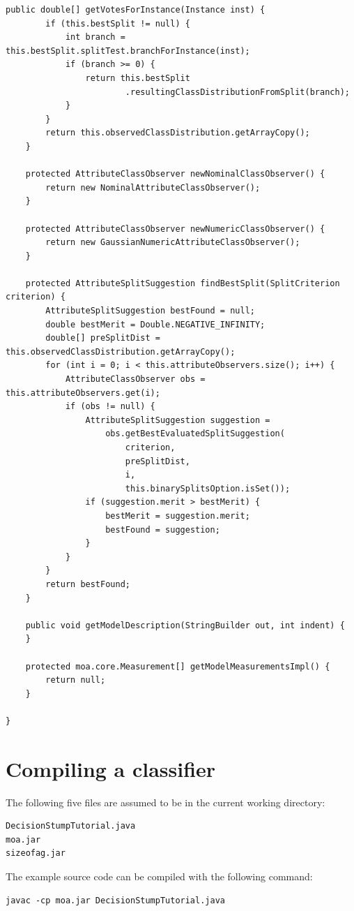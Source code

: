\documentclass[a4paper,12pt,twoside]{book}
\begin{document}
\begin{lstlisting}[caption={Full listing},label=lst:fullclassifier]
	public double[] getVotesForInstance(Instance inst) {
		if (this.bestSplit != null) {
			int branch = this.bestSplit.splitTest.branchForInstance(inst);
			if (branch >= 0) {
				return this.bestSplit
						.resultingClassDistributionFromSplit(branch);
			}
		}
		return this.observedClassDistribution.getArrayCopy();
	}

	protected AttributeClassObserver newNominalClassObserver() {
		return new NominalAttributeClassObserver();
	}

	protected AttributeClassObserver newNumericClassObserver() {
		return new GaussianNumericAttributeClassObserver();
	}

	protected AttributeSplitSuggestion findBestSplit(SplitCriterion criterion) {
		AttributeSplitSuggestion bestFound = null;
		double bestMerit = Double.NEGATIVE_INFINITY;
		double[] preSplitDist = this.observedClassDistribution.getArrayCopy();
		for (int i = 0; i < this.attributeObservers.size(); i++) {
			AttributeClassObserver obs = this.attributeObservers.get(i);
			if (obs != null) {
				AttributeSplitSuggestion suggestion =
					obs.getBestEvaluatedSplitSuggestion(
						criterion,
						preSplitDist,
						i,
						this.binarySplitsOption.isSet());
				if (suggestion.merit > bestMerit) {
					bestMerit = suggestion.merit;
					bestFound = suggestion;
				}
			}
		}
		return bestFound;
	}

	public void getModelDescription(StringBuilder out, int indent) {
	}

	protected moa.core.Measurement[] getModelMeasurementsImpl() {
		return null;
	}

}
\end{lstlisting}



\section{Compiling a classifier}

The following five files are assumed to be in the current working directory:

\begin{verbatim}
DecisionStumpTutorial.java
moa.jar
sizeofag.jar
\end{verbatim}

The example source code can be compiled with the following command:

\begin{verbatim}
javac -cp moa.jar DecisionStumpTutorial.java
\end{verbatim}
\end{document}
